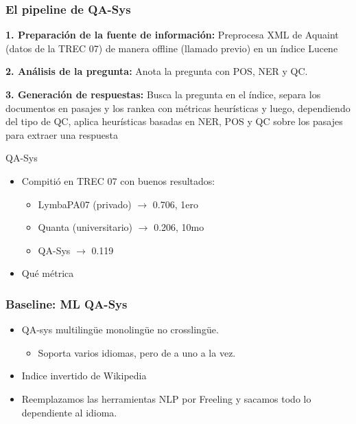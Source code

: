 \begin{frame}
\frametitle{El pipeline de QA-Sys}
  \textbf{1. Preparación de la fuente de información: } Preprocesa XML de Aquaint (datos de la TREC 07) de manera offline (llamado previo) en un índice Lucene \newline

\textbf{2. Análisis de la pregunta: } Anota la pregunta con POS, NER y QC. \newline

\textbf{3. Generación de respuestas: } Busca la pregunta en el índice, separa los documentos en pasajes y los rankea con métricas heurísticas y luego, dependiendo del tipo de QC, aplica heurísticas basadas en NER, POS y QC sobre los pasajes para extraer una respuesta\newline
  

  \begin{block}{QA-Sys}
    \begin{itemize}
      \item Compitió en TREC 07 con buenos resultados:
      \begin{itemize}
        \item  LymbaPA07 (privado)  $\rightarrow$ 0.706, 1ero
        \item Quanta (universitario) $\rightarrow$ 0.206, 10mo
        \item QA-Sys $\rightarrow$ 0.119
      \end{itemize}
      \item {\color{red}Qué métrica}
    \end{itemize}
  \end{block}

\end{frame}

\begin{frame}
\frametitle{Baseline: ML QA-Sys}
  \begin{itemize}
    \item QA-sys multilingüe monolingüe no crosslingüe.
    \begin{itemize}
      \item Soporta varios idiomas, pero de a uno a la vez.
    \end{itemize}
    \item Indice invertido de Wikipedia
    \item Reemplazamos las herramientas NLP por Freeling y sacamos todo lo dependiente al idioma.
  \end{itemize}
\end{frame}

